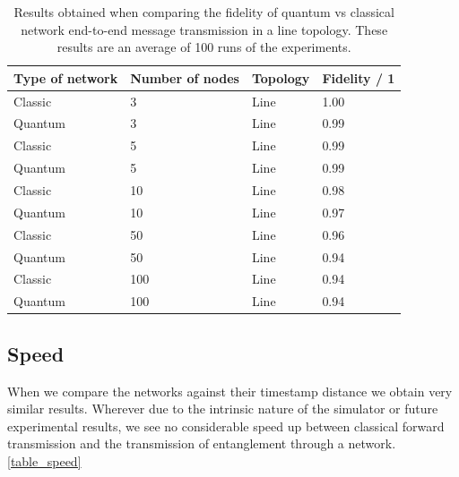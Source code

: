 \documentclass{article}
\begin{document}
    \begin{table}[!h] 
    \caption{Results obtained when comparing the fidelity of quantum vs classical network end-to-end message transmission in a line topology. These results are an average of 100 runs of the experiments.}
    \label{table_fidelity} 
    \centering 
    \begin{tabular}{|l || l|  l| l|} 
    \hline 
    Type of network & Number of nodes & Topology & Fidelity / 1 \\
    \hline 
    Classic & 3 & Line & 1.00\\ 
    Quantum & 3 & Line & 0.99\\ 
    Classic & 5 & Line & 0.99\\ 
    Quantum & 5 & Line & 0.99\\ 
    Classic & 10 & Line & 0.98\\ 
    Quantum & 10 & Line & 0.97\\ 
    Classic & 50 & Line & 0.96\\ 
    Quantum & 50 & Line & 0.94\\    
    Classic & 100 & Line & 0.94\\ 
    Quantum & 100 & Line & 0.94\\
    \hline 
    \end{tabular} 
    \end{table} 
    
    \subsection*{Speed}
    When we compare the networks against their timestamp distance we obtain very similar results. Wherever due to the intrinsic nature of the simulator or future experimental results, we see no considerable speed up between classical forward transmission and the transmission of entanglement through a network.\ref{table_speed} 
    
\end{document}
